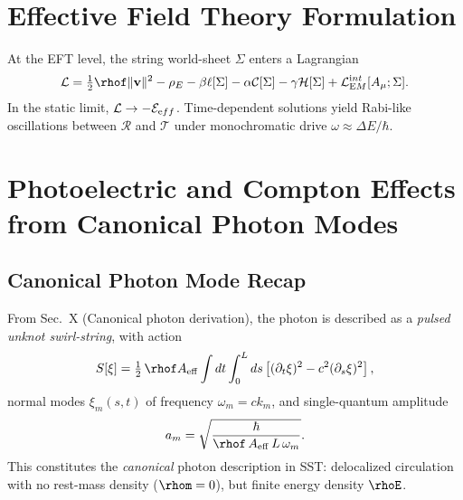 \documentclass[11pt,a4paper]{article}
\begin{document}
\section{Effective Field Theory Formulation}

At the EFT level, the string world-sheet $\Sigma$ enters a Lagrangian
\begin{equation}
\mathcal L = \tfrac12 \rhof \|\mathbf v\|^2 - \rho_E
- \beta \ell[\Sigma] - \alpha \mathcal C[\Sigma]
- \gamma \mathcal H[\Sigma] + \mathcal L_{\textrm EM}^{\textrm int}[A_\mu;\Sigma].
\end{equation}
In the static limit, $\mathcal L \to -\mathcal E_{\textrm eff}$.
Time-dependent solutions yield Rabi-like oscillations between $\mathcal R$ and $\mathcal T$ 
under monochromatic drive $\omega\approx \Delta E/\hbar$.


\section{Photoelectric and Compton Effects from Canonical Photon Modes}

    \subsection{Canonical Photon Mode Recap}
    From Sec.~X (Canonical photon derivation), the photon is described as a
    \emph{pulsed unknot swirl-string}, with action
    \[
    S[\xi] = \tfrac{1}{2}\,\rhof A_{\mathrm{eff}}
    \int dt \int_0^L ds \left[(\partial_t \xi)^2 - c^2 (\partial_s \xi)^2 \right],
    \]
    normal modes $\xi_m(s,t)$ of frequency $\omega_m=c k_m$,
    and single-quantum amplitude
    \begin{equation}
    a_m = \sqrt{\frac{\hbar}{\rhof\,A_{\mathrm{eff}}\,L\,\omega_m}}.
    \label{eq:canonical-photon-amplitude}
    \end{equation}
    This constitutes the \emph{canonical} photon description in SST:
    delocalized circulation with no rest-mass density ($\rhom=0$),
    but finite energy density $\rhoE$.
\end{document}
